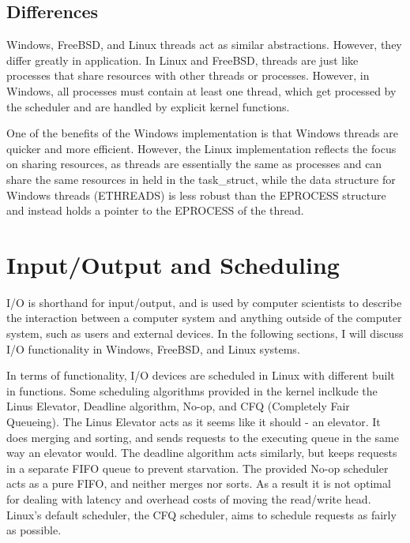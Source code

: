 \documentclass[journal, letterpaper, draftclsnofoot, onecolumn, 10pt]{IEEEtran}
\begin{document}
\subsection{Differences}

Windows, FreeBSD, and Linux threads act as similar abstractions. However, they differ greatly in application. In Linux and FreeBSD, threads are just like processes that share resources with other threads or processes. However, in Windows, all processes must contain at least one thread, which get processed by the scheduler and are handled by explicit kernel functions.

One of the benefits of the Windows implementation is that Windows threads are quicker and more efficient. However, the Linux implementation reflects the focus on sharing resources, as threads are essentially the same as processes and can share the same resources in held in the task\_struct, while the data structure for Windows threads (ETHREADS) is less robust than the EPROCESS structure and instead holds a pointer to the EPROCESS of the thread.

\section{Input/Output and Scheduling}

I/O is shorthand for input/output, and is used by computer scientists to describe the interaction between a computer system and anything outside of the computer system, such as users and external devices.
In the following sections, I will discuss I/O functionality in Windows, FreeBSD, and Linux systems.


In terms of functionality, I/O devices are scheduled in Linux with different built in functions. Some scheduling algorithms provided in the kernel inclkude the Linus Elevator, Deadline algorithm, No-op, and CFQ (Completely Fair Queueing).
The Linus Elevator acts as it seems like it should - an elevator. It does merging and sorting, and sends requests to the executing queue in the same way an elevator would. The deadline algorithm acts similarly, but keeps requests in a separate FIFO queue to
prevent starvation. The provided No-op scheduler acts as a pure FIFO, and neither merges nor sorts. As a result it is not optimal for dealing with latency and overhead costs of moving the read/write head. Linux's default scheduler, the CFQ scheduler, aims to schedule requests as fairly as possible.
\end{document}
